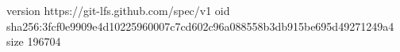 version https://git-lfs.github.com/spec/v1
oid sha256:3fcf0e9909e4d10225960007c7cd602c96a088558b3db915be695d49271249a4
size 196704
